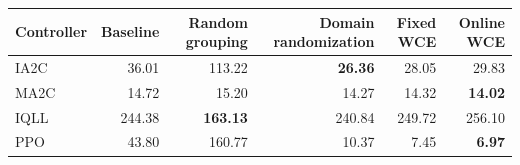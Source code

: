 \begin{tabular}{lrrrrr}
\hline
Controller & Baseline & Random grouping & Domain randomization & Fixed WCE & Online WCE \\
\hline
IA2C & 36.01 & 113.22 & \textbf{26.36} & 28.05 & 29.83 \\
MA2C & 14.72 & 15.20 & 14.27 & 14.32 & \textbf{14.02} \\
IQLL & 244.38 & \textbf{163.13} & 240.84 & 249.72 & 256.10 \\
PPO & 43.80 & 160.77 & 10.37 & 7.45 & \textbf{6.97} \\
\hline
\end{tabular}
